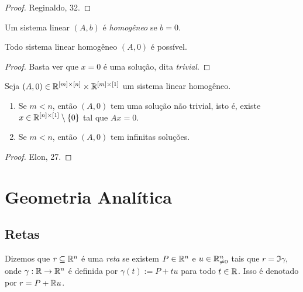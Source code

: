 \begin{proof}
    Reginaldo, 32.
\end{proof}

\begin{definition}
    Um sistema linear $(A,b)$ é \emph{homogêneo} se $b=0$.
\end{definition}

\begin{proposition}
    Todo sistema linear homogêneo $(A,0)$ é possível.
\end{proposition}

\begin{proof}
    Basta ver que $x = 0$ é uma solução, dita \emph{trivial}. \blackproof
\end{proof}

\begin{theorem} \label{teo.alglin:sislinhom}
    Seja $(A,0) \in \mathbb{R}^{[m] \times [n]} \times \mathbb{R}^{[m] \times [1]}$ um sistema linear homogêneo.
        \begin{enumerate}[leftmargin=*, align=left, label=\textbf{(\alph*)}]
            \item Se $m < n$, então $(A,0)$ tem uma solução não trivial, isto é, existe $x \in \mathbb{R}^{[n] \times [1]} \setminus \{ 0\}$ tal que $Ax=0$.
            \item Se $m < n$, então $(A,0)$ tem infinitas soluções.
        \end{enumerate}
\end{theorem}

\begin{proof}
    Elon, 27. \blackproof
\end{proof}

\chapter{Geometria Analítica}

\section{Retas}

\begin{definition}
    Dizemos que $r \subseteq \mathbb{R}^n$ é uma \emph{reta} se existem $P \in \mathbb{R}^n$ e $u \in \mathbb{R}^n_{\neq 0}$ tais que $r = \Im \gamma$, onde $\gamma : \mathbb{R} \to \mathbb{R}^n$ é definida por $\gamma(t) := P + tu$ para todo $t \in \mathbb{R}$. Isso é denotado por $r = P + \mathbb{R} u$.
\end{definition}

